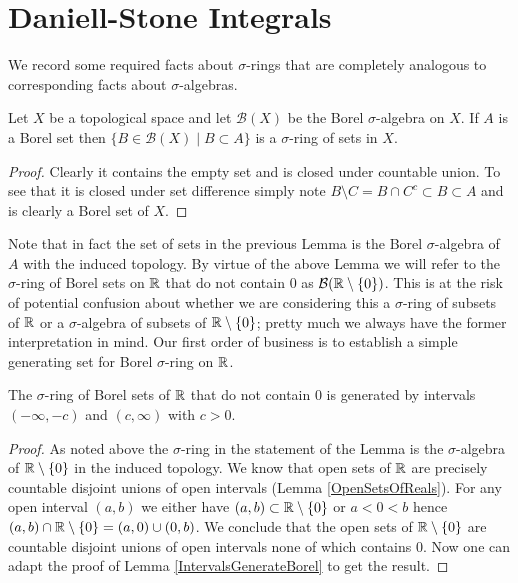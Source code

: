 \section{Daniell-Stone Integrals}

We record some required facts about $\sigma$-rings that are completely
analogous to corresponding facts about $\sigma$-algebras.

\begin{lem}Let $X$ be a topological space and let $\mathcal{B}(X)$ be
  the Borel $\sigma$-algebra on $X$.  If $A$ is a Borel set then
  $\lbrace B \in \mathcal{B}(X) \mid B \subset A \rbrace$ is a
  $\sigma$-ring of sets in $X$.
\end{lem}
\begin{proof}
Clearly it contains the empty set and is closed under countable
union.  To see that it is closed under set difference simply note $B
\setminus C = B \cap C^c \subset B \subset A$ and is clearly a Borel
set of $X$.  
\end{proof}
Note that in fact the set of sets in the previous Lemma is the Borel
$\sigma$-algebra of $A$ with the induced topology.
By virtue of the above Lemma we will refer to the $\sigma$-ring of
Borel sets on $\mathbb{R}$ that do not contain $0$ as $\mathcal{B}(\mathbb{R}
\setminus \lbrace 0 \rbrace)$.  This is at the risk of potential
confusion about whether we are considering this a $\sigma$-ring of
subsets of $\mathbb{R}$ or a $\sigma$-algebra of subsets of $\mathbb{R}
\setminus \lbrace 0 \rbrace$; pretty much we always have the former
interpretation in mind.  Our first order of business is to establish a
simple generating set for Borel $\sigma$-ring on $\mathbb{R}$.

\begin{lem}\label{IntervalsGenerateBorelPunctured}The $\sigma$-ring of Borel sets of $\mathbb{R}$ that do not
  contain $0$ is generated by intervals $(-\infty, -c)$ and $(c,
  \infty)$ with $c > 0$.
\end{lem}
\begin{proof}
As noted above the $\sigma$-ring in the statement of the Lemma is the
$\sigma$-algebra of $\mathbb{R} \setminus \lbrace 0 \rbrace$ in the
induced topology.  We know that open sets of $\mathbb{R}$ are precisely
countable disjoint unions of open intervals (Lemma
\ref{OpenSetsOfReals}).  For any open interval $(a,b)$ we either have
$(a,b) \subset \mathbb{R} \setminus \lbrace 0 \rbrace$ or $a < 0 < b$
hence $(a,b) \cap \mathbb{R} \setminus \lbrace 0 \rbrace = (a,0) \cup
(0,b)$.  We conclude that the open sets of $\mathbb{R} \setminus \lbrace 0
\rbrace$ are countable disjoint unions of open intervals none of which
contains $0$.  Now one can adapt the proof of Lemma
\ref{IntervalsGenerateBorel} to get the result.
\end{proof}

